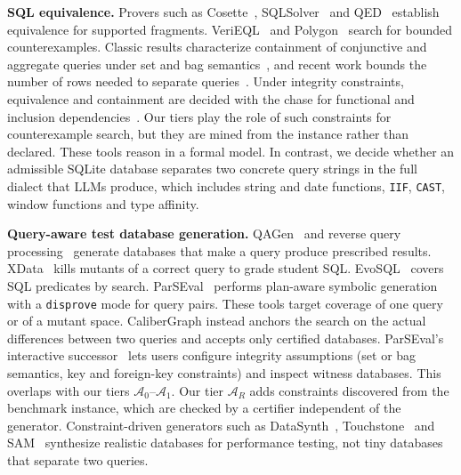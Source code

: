 \textbf{SQL equivalence.} Provers such as Cosette~\cite{chu2017cosette}, SQLSolver~\cite{ding2023sqlsolver} and QED~\cite{wang2024qed} establish equivalence for supported fragments. VeriEQL~\cite{he2024verieql} and Polygon~\cite{zhao2025polygon} search for bounded counterexamples. Classic results characterize containment of conjunctive and aggregate queries under set and bag semantics~\cite{chandra1977conjunctive,chaudhuri1993real,cohen2007aggregate}, and recent work bounds the number of rows needed to separate queries~\cite{cohen2026fewrows}. Under integrity constraints, equivalence and containment are decided with the chase for functional and inclusion dependencies~\cite{aho1979tableaux,johnson1984containment}. Our tiers play the role of such constraints for counterexample search, but they are mined from the instance rather than declared. These tools reason in a formal model. In contrast, we decide whether an admissible SQLite database separates two concrete query strings in the full dialect that LLMs produce, which includes string and date functions, \texttt{IIF}, \texttt{CAST}, window functions and type affinity.

\textbf{Query-aware test database generation.} QAGen~\cite{binnig2007qagen} and reverse query processing~\cite{binnig2007rqp} generate databases that make a query produce prescribed results. XData~\cite{chandra2015xdata} kills mutants of a correct query to grade student SQL. EvoSQL~\cite{castelein2018evosql} covers SQL predicates by search. ParSEval~\cite{chen2025parseval,chen2026parsevaldemo} performs plan-aware symbolic generation with a \texttt{disprove} mode for query pairs. These tools target coverage of one query or of a mutant space. CaliberGraph instead anchors the search on the actual differences between two queries and accepts only certified databases. ParSEval's interactive successor~\cite{chen2026parsevaldemo} lets users configure integrity assumptions (set or bag semantics, key and foreign-key constraints) and inspect witness databases. This overlaps with our tiers $\mathcal A_0$--$\mathcal A_1$. Our tier $\mathcal A_R$ adds constraints discovered from the benchmark instance, which are checked by a certifier independent of the generator. Constraint-driven generators such as DataSynth~\cite{arasu2011datasynth}, Touchstone~\cite{li2018touchstone} and SAM~\cite{yang2022sam} synthesize realistic databases for performance testing, not tiny databases that separate two queries.

